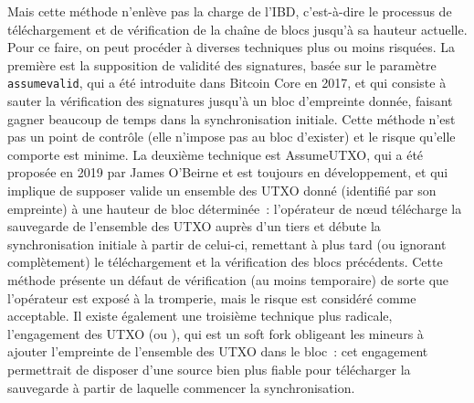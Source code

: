 Mais cette méthode n'enlève pas la charge de l'IBD, c'est-à-dire le processus de téléchargement et de vérification de la chaîne de blocs jusqu'à sa hauteur actuelle. Pour ce faire, on peut procéder à diverses techniques plus ou moins risquées. La première est la supposition de validité des signatures, basée sur le paramètre \texttt{assumevalid}, qui a été introduite dans Bitcoin Core en 2017, et qui consiste à sauter la vérification des signatures jusqu'à un bloc d'empreinte donnée, faisant gagner beaucoup de temps dans la synchronisation initiale. Cette méthode n'est pas un point de contrôle (elle n'impose pas au bloc d'exister) et le risque qu'elle comporte est minime. La deuxième technique est AssumeUTXO, qui a été proposée en 2019 par James O'Beirne et est toujours en développement, et qui implique de supposer valide un ensemble des UTXO donné (identifié par son empreinte) à une hauteur de bloc déterminée~: l'opérateur de nœud télécharge la sauvegarde de l'ensemble des UTXO auprès d'un tiers et débute la synchronisation initiale à partir de celui-ci, remettant à plus tard (ou ignorant complètement) le téléchargement et la vérification des blocs précédents. Cette méthode présente un défaut de vérification (au moins temporaire) de sorte que l'opérateur est exposé à la tromperie, mais le risque est considéré comme acceptable. Il existe également une troisième technique plus radicale, l'engagement des UTXO (ou ), qui est un soft fork obligeant les mineurs à ajouter l'empreinte de l'ensemble des UTXO dans le bloc~: cet engagement permettrait de disposer d'une source bien plus fiable pour télécharger la sauvegarde à partir de laquelle commencer la synchronisation.

